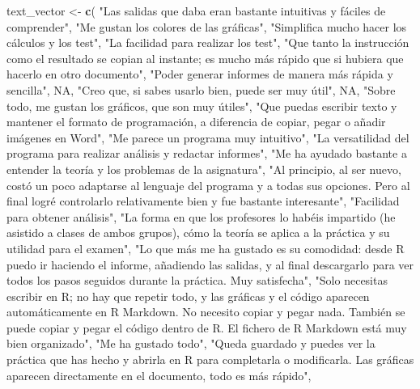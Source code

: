 \documentclass[
]{article}
\newenvironment{Shaded}{\begin{snugshade}}{\end{snugshade}}
\newcommand{\ConstantTok}[1]{\textcolor[rgb]{0.56,0.35,0.01}{#1}}
\newcommand{\FunctionTok}[1]{\textcolor[rgb]{0.13,0.29,0.53}{\textbf{#1}}}
\newcommand{\NormalTok}[1]{#1}
\newcommand{\OtherTok}[1]{\textcolor[rgb]{0.56,0.35,0.01}{#1}}
\newcommand{\StringTok}[1]{\textcolor[rgb]{0.31,0.60,0.02}{#1}}
\begin{document}
\begin{Shaded}
\begin{Highlighting}[]
\NormalTok{text\_vector }\OtherTok{\textless{}{-}} \FunctionTok{c}\NormalTok{(}
  \StringTok{"Las salidas que daba eran bastante intuitivas y fáciles de comprender"}\NormalTok{,}
  \StringTok{"Me gustan los colores de las gráficas"}\NormalTok{,}
  \StringTok{"Simplifica mucho hacer los cálculos y los test"}\NormalTok{,}
  \StringTok{"La facilidad para realizar los test"}\NormalTok{,}
  \StringTok{"Que tanto la instrucción como el resultado se copian al instante; es mucho más rápido que si hubiera que hacerlo en otro documento"}\NormalTok{,}
  \StringTok{"Poder generar informes de manera más rápida y sencilla"}\NormalTok{,}
  \ConstantTok{NA}\NormalTok{,}
  \StringTok{"Creo que, si sabes usarlo bien, puede ser muy útil"}\NormalTok{,}
  \ConstantTok{NA}\NormalTok{,}
  \StringTok{"Sobre todo, me gustan los gráficos, que son muy útiles"}\NormalTok{,}
  \StringTok{"Que puedas escribir texto y mantener el formato de programación, a diferencia de copiar, pegar o añadir imágenes en Word"}\NormalTok{,}
  \StringTok{"Me parece un programa muy intuitivo"}\NormalTok{,}
  \StringTok{"La versatilidad del programa para realizar análisis y redactar informes"}\NormalTok{,}
  \StringTok{"Me ha ayudado bastante a entender la teoría y los problemas de la asignatura"}\NormalTok{,}
  \StringTok{"Al principio, al ser nuevo, costó un poco adaptarse al lenguaje del programa y a todas sus opciones. Pero al final logré controlarlo relativamente bien y fue bastante interesante"}\NormalTok{,}
  \StringTok{"Facilidad para obtener análisis"}\NormalTok{,}
  \StringTok{"La forma en que los profesores lo habéis impartido (he asistido a clases de ambos grupos), cómo la teoría se aplica a la práctica y su utilidad para el examen"}\NormalTok{,}
  \StringTok{"Lo que más me ha gustado es su comodidad: desde R puedo ir haciendo el informe, añadiendo las salidas, y al final descargarlo para ver todos los pasos seguidos durante la práctica. Muy satisfecha"}\NormalTok{,}
  \StringTok{"Solo necesitas escribir en R; no hay que repetir todo, y las gráficas y el código aparecen automáticamente en R Markdown. No necesito copiar y pegar nada. También se puede copiar y pegar el código dentro de R. El fichero de R Markdown está muy bien organizado"}\NormalTok{,}
  \StringTok{"Me ha gustado todo"}\NormalTok{,}
  \StringTok{"Queda guardado y puedes ver la práctica que has hecho y abrirla en R para completarla o modificarla. Las gráficas aparecen directamente en el documento, todo es más rápido"}\NormalTok{,}

\end{Highlighting}
\end{Shaded}
\end{document}
